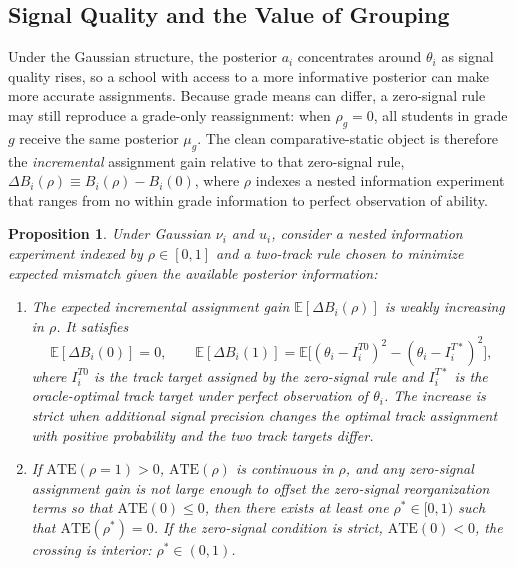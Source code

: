 \documentclass[11pt]{article}
\newtheorem{proposition}{Proposition}
\newcommand{\E}{\mathbb{E}}
\begin{document}
\subsection{Signal Quality and the Value of Grouping}

Under the Gaussian structure, the posterior $a_i$ concentrates around $\theta_i$ as signal quality rises, so a school with access to a more informative posterior can make more accurate assignments. Because grade means can differ, a zero-signal rule may still reproduce a grade-only reassignment: when $\rho_g=0$, all students in grade $g$ receive the same posterior $\mu_g$. The clean comparative-static object is therefore the \emph{incremental} assignment gain relative to that zero-signal rule, $\Delta B_i(\rho) \equiv B_i(\rho) - B_i(0)$, where $\rho$ indexes a nested information experiment that ranges from no within grade information to perfect observation of ability.

\begin{proposition}
\label{prop:threshold}
Under Gaussian $\nu_i$ and $u_i$, consider a nested information experiment indexed by $\rho \in [0,1]$ and a two-track rule chosen to minimize expected mismatch given the available posterior information:
\begin{enumerate}
\item[(i)] The expected incremental assignment gain $\E[\Delta B_i(\rho)]$ is weakly increasing in $\rho$. It satisfies
\[
\E[\Delta B_i(0)] = 0,
\qquad
\E[\Delta B_i(1)] =
\E\!\big[(\theta_i - I_i^{T0})^2 - (\theta_i - I_i^{T*})^2\big],
\]
where $I_i^{T0}$ is the track target assigned by the zero-signal rule and $I_i^{T*}$ is the oracle-optimal track target under perfect observation of $\theta_i$. The increase is strict when additional signal precision changes the optimal track assignment with positive probability and the two track targets differ.
\item[(ii)] If $\text{ATE}(\rho = 1) > 0$, $\text{ATE}(\rho)$ is continuous in $\rho$, and any zero-signal assignment gain is not large enough to offset the zero-signal reorganization terms so that $\text{ATE}(0) \leq 0$, then there exists at least one $\rho^* \in [0,1)$ such that $\text{ATE}(\rho^*) = 0$. If the zero-signal condition is strict, $\text{ATE}(0)<0$, the crossing is interior: $\rho^* \in (0,1)$.
\end{enumerate}
\end{proposition}
\end{document}
